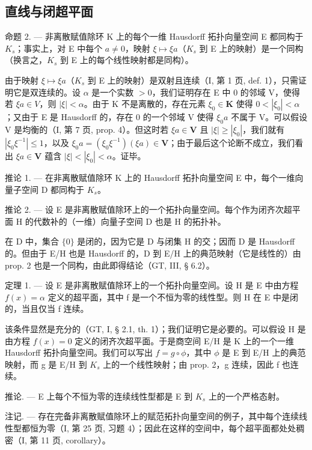 \subsection{直线与闭超平面}

命题 2. --- 非离散赋值除环 K 上的每个一维 Hausdorff 拓扑向量空间 E 都同构于 \(K_{s}\)；事实上，对 E 中每个 \(a \neq 0\)，映射 \(\xi \mapsto \xi a\)（\(K_{s}\) 到 E 上的映射）是一个同构（换言之，\(K_{s}\) 到 E 上的每个线性映射都是同构）。

由于映射 \(\xi \mapsto \xi a\)（\(K_{s}\) 到 E 上的映射）是双射且连续（I, 第 1 页, def. 1），只需证明它是双连续的。设 \(\alpha\) 是一个实数 \(>0\)，我们证明存在 E 中 0 的邻域 V，使得若 \(\xi a \in V\)，则 \(|\xi| < \alpha\)。由于 K 不是离散的，存在元素 \(\xi_0 \in \mathbf{K}\) 使得 \(0 < |\xi_0| < \alpha\)；又由于 E 是 Hausdorff 的，存在 0 的一个邻域 V 使得 \(\xi_0a\) 不属于 V。可以假设 V 是均衡的（I, 第 7 页, prop. 4）。但这时若 \(\xi a \in \mathbf{V}\) 且 \(|\xi| \geqslant |\xi_0|\)，我们就有 \(|\xi_0\xi^{-1}| \leqslant 1\)，以及 \(\xi_0a = (\xi_0\xi^{-1})(\xi a) \in \mathbf{V}\)；由于最后这个论断不成立，我们看出 \(\xi a \in \mathbf{V}\) 蕴含 \(|\xi| < |\xi_0| < \alpha\)。证毕。

推论 1. --- 在非离散赋值除环 K 上的 Hausdorff 拓扑向量空间 E 中，每个一维向量子空间 D 都同构于 \(K_{s}\)。

推论 2. --- 设 E 是非离散赋值除环上的一个拓扑向量空间。每个作为闭齐次超平面 H 的代数补的（一维）向量子空间 D 也是 H 的拓扑补。

在 D 中，集合 \(\{0\}\) 是闭的，因为它是 D 与闭集 H 的交；因而 D 是 Hausdorff 的。但由于 E/H 也是 Hausdorff 的，D 到 E/H 上的典范映射（它是线性的）由 prop. 2 也是一个同构，由此即得结论（GT, III, § 6.2）。

定理 1. --- 设 E 是非离散赋值除环上的一个拓扑向量空间。设 H 是 E 中由方程 \(f(x) = \alpha\) 定义的超平面，其中 f 是一个不恒为零的线性型。则 H 在 E 中是闭的，当且仅当 f 连续。

该条件显然是充分的（GT, I, § 2.1, th. 1）；我们证明它是必要的。可以假设 H 是由方程 \(f(x) = 0\) 定义的闭齐次超平面。于是商空间 E/H 是 K 上的一个一维 Hausdorff 拓扑向量空间。我们可以写出 \(f = g \circ \phi\)，其中 \(\phi\) 是 E 到 E/H 上的典范映射，而 g 是 E/H 到 \(K_{s}\) 上的一个线性映射；由 prop. 2，g 连续，因此 f 也连续。

推论. --- E 上每个不恒为零的连续线性型都是 E 到 \(K_{s}\) 上的一个严格态射。

注记. --- 存在完备非离散赋值除环上的赋范拓扑向量空间的例子，其中每个连续线性型都恒为零（I, 第 25 页, 习题 4）；因此在这样的空间中，每个超平面都处处稠密（I, 第 11 页, corollary）。

